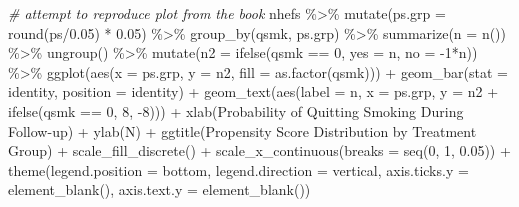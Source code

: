 \documentclass[
  10pt,
]{book}
\newenvironment{Shaded}{\begin{snugshade}}{\end{snugshade}}
\newcommand{\AttributeTok}[1]{\textcolor[rgb]{0.77,0.63,0.00}{#1}}
\newcommand{\CommentTok}[1]{\textcolor[rgb]{0.56,0.35,0.01}{\textit{#1}}}
\newcommand{\DecValTok}[1]{\textcolor[rgb]{0.00,0.00,0.81}{#1}}
\newcommand{\FloatTok}[1]{\textcolor[rgb]{0.00,0.00,0.81}{#1}}
\newcommand{\FunctionTok}[1]{\textcolor[rgb]{0.00,0.00,0.00}{#1}}
\newcommand{\NormalTok}[1]{#1}
\newcommand{\SpecialCharTok}[1]{\textcolor[rgb]{0.00,0.00,0.00}{#1}}
\newcommand{\StringTok}[1]{\textcolor[rgb]{0.31,0.60,0.02}{#1}}
\begin{document}
\begin{Shaded}
\begin{Highlighting}[]
\CommentTok{\# attempt to reproduce plot from the book}
\NormalTok{nhefs }\SpecialCharTok{\%\textgreater{}\%}
  \FunctionTok{mutate}\NormalTok{(}\AttributeTok{ps.grp =} \FunctionTok{round}\NormalTok{(ps}\SpecialCharTok{/}\FloatTok{0.05}\NormalTok{) }\SpecialCharTok{*} \FloatTok{0.05}\NormalTok{) }\SpecialCharTok{\%\textgreater{}\%}
  \FunctionTok{group\_by}\NormalTok{(qsmk, ps.grp) }\SpecialCharTok{\%\textgreater{}\%}
  \FunctionTok{summarize}\NormalTok{(}\AttributeTok{n =} \FunctionTok{n}\NormalTok{()) }\SpecialCharTok{\%\textgreater{}\%}
  \FunctionTok{ungroup}\NormalTok{() }\SpecialCharTok{\%\textgreater{}\%}
  \FunctionTok{mutate}\NormalTok{(}\AttributeTok{n2 =} \FunctionTok{ifelse}\NormalTok{(qsmk }\SpecialCharTok{==} \DecValTok{0}\NormalTok{, }\AttributeTok{yes =}\NormalTok{ n, }\AttributeTok{no =}  \SpecialCharTok{{-}}\DecValTok{1}\SpecialCharTok{*}\NormalTok{n)) }\SpecialCharTok{\%\textgreater{}\%}
  \FunctionTok{ggplot}\NormalTok{(}\FunctionTok{aes}\NormalTok{(}\AttributeTok{x =}\NormalTok{ ps.grp, }\AttributeTok{y =}\NormalTok{ n2, }\AttributeTok{fill =} \FunctionTok{as.factor}\NormalTok{(qsmk))) }\SpecialCharTok{+}
  \FunctionTok{geom\_bar}\NormalTok{(}\AttributeTok{stat =} \StringTok{\textquotesingle{}identity\textquotesingle{}}\NormalTok{, }\AttributeTok{position =} \StringTok{\textquotesingle{}identity\textquotesingle{}}\NormalTok{) }\SpecialCharTok{+}
  \FunctionTok{geom\_text}\NormalTok{(}\FunctionTok{aes}\NormalTok{(}\AttributeTok{label =}\NormalTok{ n, }\AttributeTok{x =}\NormalTok{ ps.grp, }\AttributeTok{y =}\NormalTok{ n2 }\SpecialCharTok{+} \FunctionTok{ifelse}\NormalTok{(qsmk }\SpecialCharTok{==} \DecValTok{0}\NormalTok{, }\DecValTok{8}\NormalTok{, }\SpecialCharTok{{-}}\DecValTok{8}\NormalTok{))) }\SpecialCharTok{+}
  \FunctionTok{xlab}\NormalTok{(}\StringTok{\textquotesingle{}Probability of Quitting Smoking During Follow{-}up\textquotesingle{}}\NormalTok{) }\SpecialCharTok{+}
  \FunctionTok{ylab}\NormalTok{(}\StringTok{\textquotesingle{}N\textquotesingle{}}\NormalTok{) }\SpecialCharTok{+}
  \FunctionTok{ggtitle}\NormalTok{(}\StringTok{\textquotesingle{}Propensity Score Distribution by Treatment Group\textquotesingle{}}\NormalTok{) }\SpecialCharTok{+}
  \FunctionTok{scale\_fill\_discrete}\NormalTok{(}\StringTok{\textquotesingle{}\textquotesingle{}}\NormalTok{) }\SpecialCharTok{+}
  \FunctionTok{scale\_x\_continuous}\NormalTok{(}\AttributeTok{breaks =} \FunctionTok{seq}\NormalTok{(}\DecValTok{0}\NormalTok{, }\DecValTok{1}\NormalTok{, }\FloatTok{0.05}\NormalTok{)) }\SpecialCharTok{+}
  \FunctionTok{theme}\NormalTok{(}\AttributeTok{legend.position =} \StringTok{\textquotesingle{}bottom\textquotesingle{}}\NormalTok{, }\AttributeTok{legend.direction =} \StringTok{\textquotesingle{}vertical\textquotesingle{}}\NormalTok{,}
        \AttributeTok{axis.ticks.y =} \FunctionTok{element\_blank}\NormalTok{(),}
        \AttributeTok{axis.text.y =} \FunctionTok{element\_blank}\NormalTok{())}
\end{Highlighting}
\end{Shaded}
\end{document}
